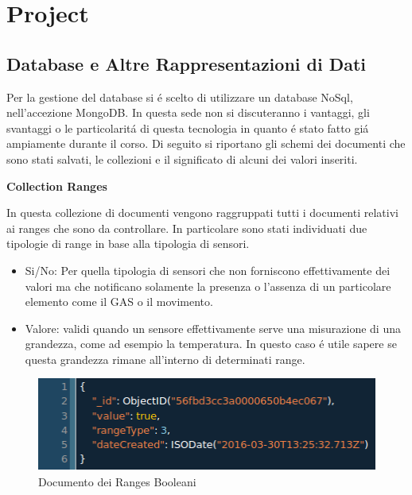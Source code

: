 \section{Project}
\subsection{Database e Altre Rappresentazioni di Dati}

Per la gestione del database si \'e scelto di utilizzare un database NoSql, nell'accezione MongoDB\cite{MongoDB}. In questa sede non si discuteranno i vantaggi, gli svantaggi o le particolarit\'a di questa tecnologia in quanto \'e stato fatto gi\'a ampiamente durante il corso. Di seguito si riportano gli schemi dei documenti che sono stati salvati, le collezioni e il significato di alcuni dei valori inseriti.

\begin{center}
\textbf{Collection Ranges}
\end{center}

In questa collezione di documenti vengono raggruppati tutti i documenti relativi ai ranges che sono da controllare. In particolare sono stati individuati due tipologie di range in base alla tipologia di sensori.

\begin{itemize}
  \item Si/No: Per quella tipologia di sensori che non forniscono effettivamente dei valori ma che notificano solamente la presenza o l'assenza di un particolare elemento come il GAS o il movimento.
  \item  Valore: validi quando un sensore effettivamente serve una misurazione di una grandezza, come ad esempio la temperatura. In questo caso \'e utile sapere se questa grandezza rimane all'interno di determinati range.
\end{itemize}

\begin{figure}[ht]
\centering
\includegraphics[width=\textwidth,natwidth=610,natheight=642]{Figures/DataStructures/RangesBoolean.png}
\caption{Documento dei Ranges Booleani}
\end{figure}

